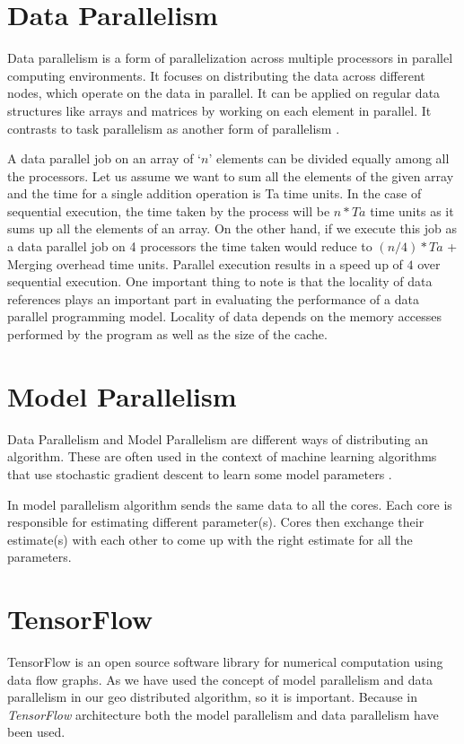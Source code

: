 \documentclass[12pt,notitlepage,oneside]{report}
\begin{document}
\section{Data Parallelism}
Data parallelism is a form of parallelization across multiple processors in parallel computing environments. It focuses on distributing the data across different nodes, which operate on the data in parallel. It can be applied on regular data structures like arrays and matrices by working on each element in parallel. It contrasts to task parallelism as another form of parallelism \cite{dparallel}.

A data parallel job on an array of `$n$' elements can be divided equally among all the processors. Let us assume we want to sum all the elements of the given array and the time for a single addition operation is Ta time units. In the case of sequential execution, the time taken by the process will be $n*Ta$ time units as it sums up all the elements of an array. On the other hand, if we execute this job as a data parallel job on 4 processors the time taken would reduce to $(n/4)*Ta$ + Merging overhead time units. Parallel execution results in a speed up of $4$ over sequential execution. One important thing to note is that the locality of data references plays an important part in evaluating the performance of a data parallel programming model. Locality of data depends on the memory accesses performed by the program as well as the size of the cache.

\section{Model Parallelism}

Data Parallelism and Model Parallelism are different ways of distributing an algorithm. These are often used in the context of machine learning algorithms that use stochastic gradient descent to learn some model parameters \cite{mparallel}.

In model parallelism algorithm sends the same data to all the cores. Each core is responsible for estimating different parameter(s). Cores then exchange their estimate(s) with each other to come up with the right estimate for  all the parameters.


\section{TensorFlow}

TensorFlow \cite{tensor} is an open source software library for numerical computation using data flow graphs. As we have used the concept of model parallelism and data parallelism in our geo distributed algorithm, so it is important. Because in \textit{TensorFlow}  architecture both the model parallelism and data parallelism have been used.
\end{document}

